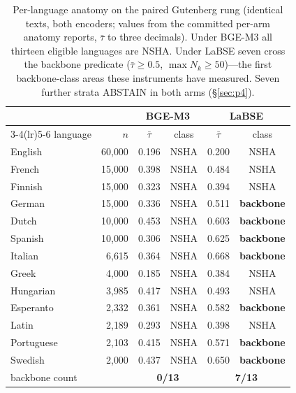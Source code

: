 \documentclass[11pt]{article}
\newcommand{\tmean}{\bar{\tau}}
\begin{document}
\begin{table}[t]
\centering
\small
\setlength{\tabcolsep}{4pt}
\begin{tabular}{lrcccc}
\toprule
 & & \multicolumn{2}{c}{BGE-M3} & \multicolumn{2}{c}{LaBSE} \\
\cmidrule(lr){3-4}\cmidrule(lr){5-6}
language & $n$ & $\tmean$ & class & $\tmean$ & class \\
\midrule
English    & 60{,}000 & 0.196 & NSHA & 0.200 & NSHA \\
French     & 15{,}000 & 0.398 & NSHA & 0.484 & NSHA \\
Finnish    & 15{,}000 & 0.323 & NSHA & 0.394 & NSHA \\
German     & 15{,}000 & 0.336 & NSHA & 0.511 & \textbf{backbone} \\
Dutch      & 10{,}000 & 0.453 & NSHA & 0.603 & \textbf{backbone} \\
Spanish    & 10{,}000 & 0.306 & NSHA & 0.625 & \textbf{backbone} \\
Italian    &  6{,}615 & 0.364 & NSHA & 0.668 & \textbf{backbone} \\
Greek      &  4{,}000 & 0.185 & NSHA & 0.384 & NSHA \\
Hungarian  &  3{,}985 & 0.417 & NSHA & 0.493 & NSHA \\
Esperanto  &  2{,}332 & 0.361 & NSHA & 0.582 & \textbf{backbone} \\
Latin      &  2{,}189 & 0.293 & NSHA & 0.398 & NSHA \\
Portuguese &  2{,}103 & 0.415 & NSHA & 0.571 & \textbf{backbone} \\
Swedish    &  2{,}000 & 0.437 & NSHA & 0.650 & \textbf{backbone} \\
\midrule
\multicolumn{2}{l}{backbone count} & \multicolumn{2}{c}{\textbf{0/13}} &
  \multicolumn{2}{c}{\textbf{7/13}} \\
\bottomrule
\end{tabular}
\caption{Per-language anatomy on the paired Gutenberg rung (identical
texts, both encoders; values from the committed per-arm anatomy reports,
$\tmean$ to three decimals). Under BGE-M3 all thirteen eligible languages
are NSHA. Under LaBSE seven cross the backbone predicate
($\tmean \ge 0.5$, $\max N_k \ge 50$)---the first backbone-class areas
these instruments have measured. Seven further strata ABSTAIN in both arms
(\S\ref{sec:p4}).}
\label{tab:p2anatomy}
\end{table}
\end{document}
